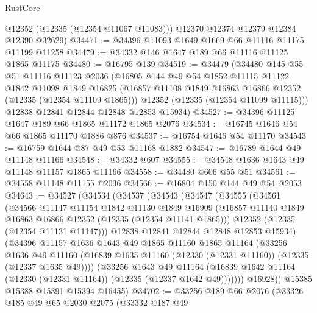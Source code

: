 \begin{lexlean}{RustCore}
\begin{coremodule}
        @12352
        (@12335 (@12354 @11067 @11083)))
      @12370
      @12374
      @12379
      @12384
      @12390
      @32629)
@34471 := @34396 @11093 @1649 @1669 @66 @11116 @11175 @11199 @11258
@34479 := @34332 @146 @1647 @189 @66 @11116 @11125 @1865 @11175
@34480 := @16795 @139
@34519 := @34479
    (@34480
      @145
      @55
      @51
      @11116
      @11123
      @2036
      (@16805
        @144
        @49
        @54
        @1852
        @11115
        @11122
        @1842
        @11098
        @1849
        @16825
        (@16857 @11108 @1849 @16863 @16866 @12352 (@12335 (@12354 @11109 @1865)))
        @12352
        (@12335 (@12354 @11099 @11115)))
      @12838
      @12841
      @12844
      @12848
      @12853
      @15934)
@34527 := @34396 @11125 @1647 @189 @66 @1865 @11172 @1865 @2076
@34534 := @16745 @1646 @54 @66 @1865 @11170 @1886 @876
@34537 := @16754 @1646 @54 @11170
@34543 := @16759 @1644 @87 @49 @53 @11168 @1882
@34547 := @16789 @1644 @49 @11148 @11166
@34548 := @34332 @607
@34555 := @34548 @1636 @1643 @49 @11148 @11157 @1865 @11166
@34558 := @34480 @606 @55 @51
@34561 := @34558 @11148 @11155 @2036
@34566 := @16804 @150 @144 @49 @54 @2053
@34643 := @34527
    (@34534
      (@34537
        (@34543
          (@34547
            (@34555
              (@34561
                (@34566
                  @11147
                  @11154
                  @1842
                  @11130
                  @1849
                  @16909
                  (@16857 @11140 @1849 @16863 @16866 @12352 (@12335 (@12354 @11141 @1865)))
                  @12352
                  (@12335 (@12354 @11131 @11147)))
                @12838
                @12841
                @12844
                @12848
                @12853
                @15934)
              (@34396
                @11157
                @1636
                @1643
                @49
                @1865
                @11160
                @1865
                @11164
                (@33256
                  @1636
                  @49
                  @11160
                  (@16839 @1635 @11160 (@12330 (@12331 @11160)) (@12335 (@12337 @1635 @49))))
                (@33256
                  @1643
                  @49
                  @11164
                  (@16839 @1642 @11164 (@12330 (@12331 @11164)) (@12335 (@12337 @1642 @49)))))))
          @16928))
      @15385
      @15388
      @15391
      @15394
      @16455)
@34702 := @33256
    @189
    @66
    @2076
    (@33326
      @185
      @49
      @65
      @2030
      @2075
      (@33332
        @187
        @49

\end{coremodule}
\end{lexlean}
